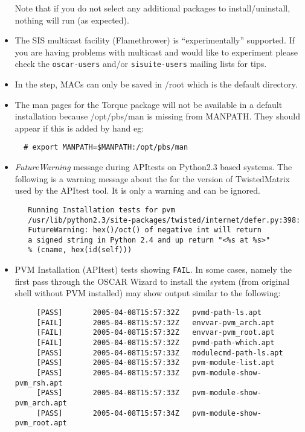 \begin{itemize}
  Note that if you do not select any additional packages to
  install/uninstall, nothing will run (as expected).

\item The SIS multicast facility (Flamethrower) is ``experimentally''
  supported.  If you are having problems with multicast and would like
  to experiment please check the {\tt oscar-users} and/or
  {\tt sisuite-users} mailing lists for tips.

\begchange
\item In the  step, MACs can
  only be saved in /root which is the default directory.

\item The man pages for the Torque package will not be available in
  a default installation because /opt/pbs/man is missing from
  MANPATH.  They should appear if this is added by hand eg:

\begin{verbatim}
  # export MANPATH=$MANPATH:/opt/pbs/man
\end{verbatim}
\endchange


\item \emph{FutureWarning} message during APItests on Python2.3 based systems.
   The following is a warning message about the for the version of
   TwistedMatrix used by the APItest tool.  It is only a warning and can be
   ignored.
   \begin{small}
   \begin{verbatim}
   Running Installation tests for pvm
   /usr/lib/python2.3/site-packages/twisted/internet/defer.py:398:
   FutureWarning: hex()/oct() of negative int will return
   a signed string in Python 2.4 and up return "<%s at %s>" 
   % (cname, hex(id(self)))
   \end{verbatim}
   \end{small}

\item PVM Installation (APItest) tests showing {\tt FAIL}.  In some cases,
  namely the first pass through the OSCAR Wizard to install the system (from
  original shell without PVM installed) may show output similar to the
  following:
  \begin{small}
  \begin{verbatim}
     [PASS]       2005-04-08T15:57:32Z   pvmd-path-ls.apt
     [FAIL]       2005-04-08T15:57:32Z   envvar-pvm_arch.apt
     [FAIL]       2005-04-08T15:57:32Z   envvar-pvm_root.apt
     [FAIL]       2005-04-08T15:57:32Z   pvmd-path-which.apt
     [PASS]       2005-04-08T15:57:33Z   modulecmd-path-ls.apt
     [PASS]       2005-04-08T15:57:33Z   pvm-module-list.apt
     [PASS]       2005-04-08T15:57:33Z   pvm-module-show-pvm_rsh.apt
     [PASS]       2005-04-08T15:57:33Z   pvm-module-show-pvm_arch.apt
     [PASS]       2005-04-08T15:57:34Z   pvm-module-show-pvm_root.apt
  \end{verbatim}
  \end{small}


\end{itemize}
